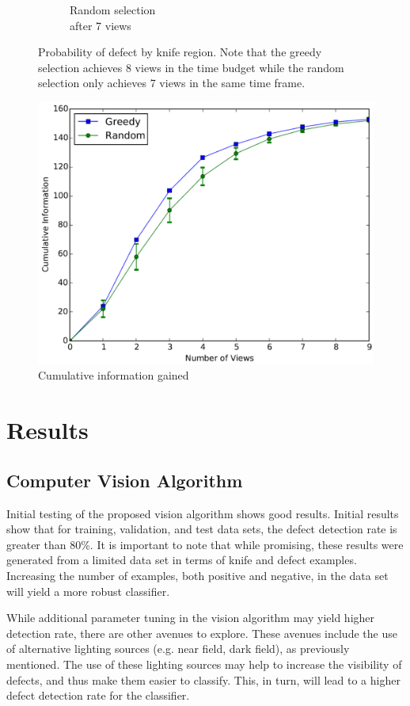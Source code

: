\documentclass[letterpaper, 10 pt, conference]{ieeeconf}  %
\begin{document}
\begin{figure}
\begin{subfigure}[b]{.24\textwidth}
        \caption{Random selection \\ after 7 views}
        \vspace*{2mm}
        \label{fig:rand7view}
    \end{subfigure}
    \caption{Probability of defect by knife region. Note that the greedy \\ selection achieves 8 views in the time budget while the random \\ selection only achieves 7 views in the same time frame.}
    \label{fig:prob_dists}
\end{figure}

\begin{figure}
    \centering
    \includegraphics[width=.49\textwidth]{info_gain_views.png}
    \caption{Cumulative information gained}
    \vspace*{2mm}
    \label{fig:cumulative_info}
\end{figure}

\section{Results}

\subsection{Computer Vision Algorithm}

Initial testing of the proposed vision algorithm shows good results. Initial results show that for training, validation, and test data sets, the defect detection rate is greater than 80\%. It is important to note that while promising, these results were generated from a limited data set in terms of knife and defect examples. Increasing the number of examples, both positive and negative, in the data set will yield a more robust classifier.

While additional parameter tuning in the vision algorithm may yield higher detection rate, there are other avenues to explore. These avenues include the use of alternative lighting sources (e.g. near field, dark field), as previously mentioned. The use of these lighting sources may help to increase the visibility of defects, and thus make them easier to classify. This, in turn, will lead to a higher defect detection rate for the classifier.
\end{document}

